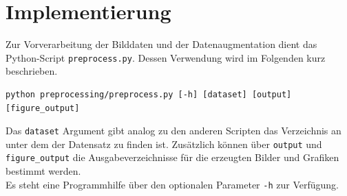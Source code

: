 \section{Implementierung}

Zur Vorverarbeitung der Bilddaten und der Datenaugmentation dient das Python-Script \verb|preprocess.py|. Dessen Verwendung wird im Folgenden kurz beschrieben.

\begin{verbatim}
python preprocessing/preprocess.py [-h] [dataset] [output] [figure_output]
\end{verbatim}

Das \verb|dataset| Argument gibt analog zu den anderen Scripten das Verzeichnis an unter dem der Datensatz zu finden ist. Zusätzlich können über \verb|output| und \verb|figure_output| die Ausgabeverzeichnisse für die erzeugten Bilder und Grafiken bestimmt werden.\\
Es steht eine Programmhilfe über den optionalen Parameter \verb|-h| zur Verfügung.
